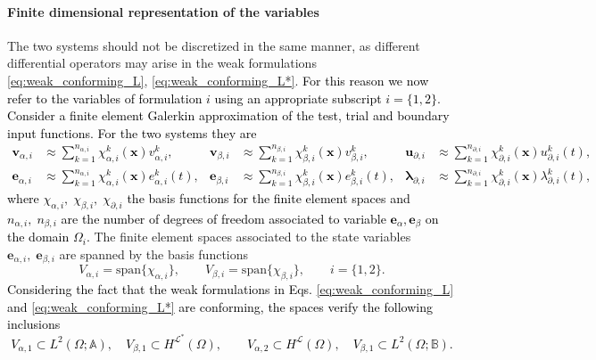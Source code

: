 \documentclass[11pt,a4paper]{article}
\newcommand{\revone}[1]{{\textcolor{black}{#1}}}
\begin{document}
\paragraph{Finite dimensional representation of the variables}
The two systems should not be discretized in the same manner, as different differential operators may arise in the weak formulations \eqref{eq:weak_conforming_L}, \eqref{eq:weak_conforming_L*}. \revone{For this reason we now refer to the variables of formulation $i$ using an appropriate subscript $i=\{1, 2\}$. Consider a finite element Galerkin approximation of the test, trial and boundary input functions. For the two systems they are
\begin{equation}
\begin{aligned}
\bm{v}_{\alpha, i} &\approx \sum_{k=1}^{n_{\alpha, i}}\chi_{\alpha, i}^k(\bm{x})v_{\alpha, i}^k, & \bm{v}_{\beta, i} &\approx \sum_{k=1}^{n_{\beta, i}}\chi_{\beta, i}^k(\bm{x})v_{\beta, i}^k, & \bm{u}_{\partial, i} &\approx \sum_{k=1}^{n_{\partial, i}}\chi_{\partial, i}^k(\bm{x})u_{\partial, i}^k(t), \\
\bm{e}_{\alpha, i} &\approx \sum_{k=1}^{n_{\alpha, i}}\chi_{\alpha, i}^k(\bm{x})e_{\alpha, i}^k(t), & \bm{e}_{\beta, i} &\approx \sum_{k=1}^{n_{\beta, i}}\chi_{\beta, i}^k(\bm{x})e_{\beta, i}^k(t), & \bm{\lambda}_{\partial, i} &\approx \sum_{k=1}^{n_{\partial, i}}\chi_{\partial, i}^k(\bm{x})\lambda_{\partial, i}^k(t), 
\end{aligned}
\label{eq:BasisFunction}
\end{equation}
where $\chi_{\alpha, i}, \; \chi_{\beta, i}, \; \chi_{\partial, i}$ the basis functions for the finite element spaces and $n_{\alpha, i}, \; n_{\beta, i}$ are the number of degrees of freedom associated to variable $\bm{e}_{\alpha}, \bm{e}_{\beta}$ on the domain $\Omega_i$.} The finite element spaces associated to the state variables $\bm{e}_{\alpha, i}, \; \bm{e}_{\beta, i}$ are spanned by the basis functions
\begin{equation}
    V_{\alpha, i} = \mathrm{span}\{\chi_{\alpha, i}\}, \qquad V_{\beta, i} = \mathrm{span}\{\chi_{\beta, i}\},  \qquad i=\{1, 2\}.
\end{equation}
\revone{Considering the fact that the weak formulations in Eqs. \eqref{eq:weak_conforming_L} and \eqref{eq:weak_conforming_L*} are conforming, the spaces verify the following inclusions
\begin{equation}
    V_{\alpha, 1} \subset L^2(\Omega; \mathbb{A}), \quad V_{\beta, 1} \subset H^{\mathcal{L}^*}(\Omega), \qquad V_{\alpha, 2} \subset H^{\mathcal{L}}(\Omega), \quad V_{\beta, 1} \subset L^2(\Omega; \mathbb{B}).
\end{equation}
}
\end{document}
